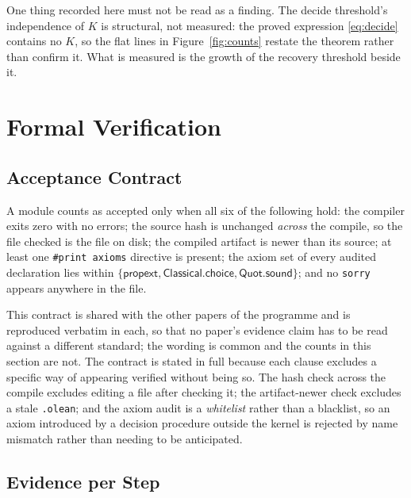 One thing recorded here must not be read as a finding. The decide threshold's independence of
$K$ is structural, not measured: the proved expression \eqref{eq:decide} contains no $K$, so
the flat lines in Figure~\ref{fig:counts} restate the theorem rather than confirm it. What is
measured is the growth of the recovery threshold beside it.

\section{Formal Verification}
\label{sec:verification}

\subsection{Acceptance Contract}

A module counts as accepted only when all six of the following hold: the compiler exits zero
with no errors; the source hash is unchanged \emph{across} the compile, so the file checked is
the file on disk; the compiled artifact is newer than its source; at least one
\texttt{\#print axioms} directive is present; the axiom set of every audited declaration lies
within $\{\textsf{propext},\textsf{Classical.choice},\textsf{Quot.sound}\}$; and no
\texttt{sorry} appears anywhere in the file.

This contract is shared with the other papers of the programme and is reproduced verbatim in
each, so that no paper's evidence claim has to be read against a different standard; the
wording is common and the counts in this section are not. The contract is stated in full
because each clause excludes a specific way of appearing verified without being so. The hash check across the compile excludes editing a file after
checking it; the artifact-newer check excludes a stale \texttt{.olean}; and the axiom audit is
a \emph{whitelist} rather than a blacklist, so an axiom introduced by a decision procedure
outside the kernel is rejected by name mismatch rather than needing to be anticipated.

\subsection{Evidence per Step}

